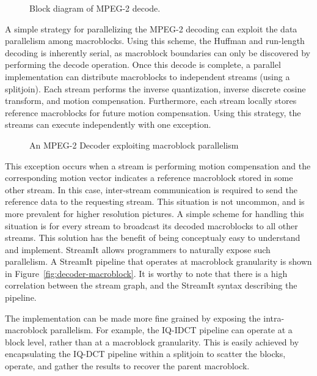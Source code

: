 \begin{figure}[htbp]
\centerline{}
\caption{Block diagram of MPEG-2 decode.}
\label{fig:dec_block}
\end{figure}

A simple strategy for parallelizing the MPEG-2 decoding can exploit
the data parallelism among macroblocks. Using this scheme, the Huffman
and run-length decoding is inherently serial, as macroblock boundaries
can only be discovered by performing the decode operation.  Once this
decode is complete, a parallel implementation can distribute
macroblocks to independent streams (using a splitjoin). Each stream
performs the inverse quantization, inverse discrete cosine transform,
and motion compensation. Furthermore, each stream locally stores
reference macroblocks for future motion compensation. Using this
strategy, the streams can execute independently with one exception.

\begin{figure}
\caption{An MPEG-2 Decoder exploiting macroblock parallelism}
\label{decoder_macroblock_parallelism}
\end{figure}

This exception occurs when a stream is performing motion compensation
and the corresponding motion vector indicates a reference macroblock
stored in some other stream. In this case, inter-stream communication
is required to send the reference data to the requesting stream. This
situation is not uncommon, and is more prevalent for higher resolution
pictures. A simple scheme for handling this situation is for every
stream to broadcast its decoded macroblocks to all other streams. This
solution has the benefit of being conceptualy easy to understand and
implement. StreamIt allows programmers to naturally expose such
parallelism. A StreamIt pipeline that operates at macroblock
granularity is shown in Figure~\ref{fig:decoder-macroblock}. It is
worthy to note that there is a high correlation between the stream
graph, and the StreamIt syntax describing the pipeline.

The implementation can be made more fine grained by exposing the
intra-macroblock parallelism. For example, the IQ-IDCT pipeline can
operate at a block level, rather than at a macroblock
granularity. This is easily achieved by encapsulating the IQ-DCT pipeline
within a splitjoin to scatter the blocks, operate, and gather the
results to recover the parent macroblock.

